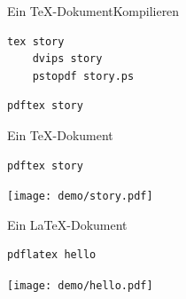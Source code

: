 \begin{Frame}[fragile]{Ein \TeX-Dokument}{Kompilieren}
  \begin{lstlisting}[language={},morekeywords={tex,dvips,pstopdf},gobble=4]
    tex story
    dvips story
    pstopdf story.ps
  \end{lstlisting}

  \xxx
  \pause


  \begin{lstlisting}[language={},morekeywords={pdftex},gobble=4]
    pdftex story
  \end{lstlisting}
\end{Frame}

\begin{Frame}[fragile]{Ein \TeX-Dokument}
  

  \xxx

  \begin{lstlisting}[language={},morekeywords={pdflatex},gobble=4]
    pdftex story
  \end{lstlisting}

  \xxx

  \begin{center}
    \texttt{[image: demo/story.pdf]}
  \end{center}
\end{Frame}

\begin{Frame}[fragile,t]{Ein \LaTeX-Dokument}
  

  \pause
  \xxx

  \begin{lstlisting}[language={},morekeywords={pdflatex},gobble=4]
    pdflatex hello
  \end{lstlisting}

  \pause
  \xxx

  \begin{center}
    \texttt{[image: demo/hello.pdf]}
  \end{center}
\end{Frame}

